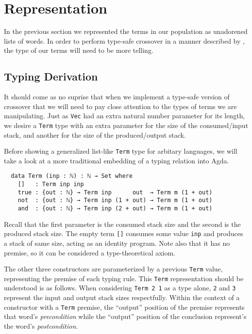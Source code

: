 \documentclass[runningheads,a4paper]{llncs}
\begin{document}
\section{Representation}

In the previous section we represented the terms in our population as
unadorened lists of words. In order to perform type-safe crossover in
a manner described by \cite{tchernev:forthcross}, the type of our
terms will need to be more telling.

\subsection{Typing Derivation}

It should come as no suprise that when we implement a type-safe
version of crossover that we will need to pay close attention to the
types of terms we are manipulating. Just as \texttt{Vec} had an extra
natural number parameter for its length, we desire a \texttt{Term}
type with an extra parameter for the size of the consumed/input stack, and
another for the size of the produced/output stack.

Before showing a generalized list-like \texttt{Term} type for arbitary
languages, we will take a look at a more traditional embedding of a
typing relation into Agda.

\begin{verbatim}
  data Term (inp : ℕ) : ℕ → Set where
    []   : Term inp inp
    true : {out : ℕ} → Term inp      out  → Term m (1 + out)
    not  : {out : ℕ} → Term inp (1 + out) → Term m (1 + out)
    and  : {out : ℕ} → Term inp (2 + out) → Term m (1 + out)
\end{verbatim}

Recall that the first parameter is the consumed stack size and the second
is the produced stack size. The empty term \texttt{[]} consumes
some value \texttt{inp} and produces a stack of same size, acting as
an identity program. Note also that it has no premise, so it can be
considered a type-theoretical axiom.

The other three constructors are parameterized by a previous
\texttt{Term} value, representing the premise of each typing rule.
This \texttt{Term} representation should be understood is as
follows. When considering \texttt{Term 2 1} as a type alone,
\texttt{2} and \texttt{3} represent the input and output stack sizes
respectfully. Within the context of a constructor with a \texttt{Term}
premise, the ``output'' position of the premise represents that word's
\textit{precondition} while the ``output'' position of the conclusion
represent's the word's \textit{postcondition}.
\end{document}
